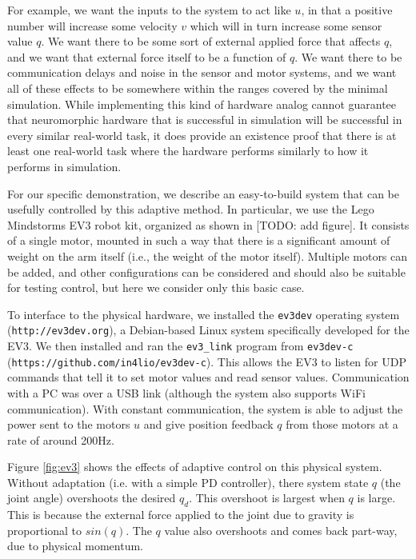 \documentclass{frontiersSCNS} %
\begin{document}
For example, we want the inputs to the system to act like $u$, in that a
positive number will increase some velocity $v$ which will in turn increase some
sensor value $q$.  We want there to be some sort of external applied force that
affects $q$, and we want that external force itself to be a function of $q$.
We want there to be communication delays and noise in the sensor and motor
systems, and we want all of these effects to be somewhere within the
ranges covered by the minimal simulation.  While implementing this kind of
hardware analog cannot guarantee that neuromorphic hardware
that is successful in simulation will be successful in every similar
real-world task, it does provide an existence proof that there is at least
one real-world task where the hardware performs similarly to how it performs in simulation.

For our specific demonstration, we describe an easy-to-build system that can be usefully controlled
by this adaptive method.  In particular, we use the Lego Mindstorms EV3 robot kit,
organized as shown in [TODO: add figure].  It consists of a single
motor, mounted in such a way that there is a significant amount of weight on
the arm itself (i.e., the weight of the motor itself).  Multiple motors can be
added, and other configurations can be considered and should also be suitable
for testing control, but here we consider only this basic case.

To interface to the physical hardware, we installed the \texttt{ev3dev} operating
system (\texttt{http://ev3dev.org}), a Debian-based Linux system specifically developed
for the EV3.  We then installed and ran the \texttt{ev3\_link} program from \texttt{ev3dev-c}
(\texttt{https://github.com/in4lio/ev3dev-c}).  This allows the EV3 to listen for
UDP commands that tell it to set motor values and read sensor values.
Communication with a PC was over a USB link (although the system also
supports WiFi communication).  With constant communication, the system is
able to adjust the power sent to the motors $u$ and give position feedback
$q$ from those motors at a rate of around 200Hz.

Figure \ref{fig:ev3} shows the effects of adaptive control on this physical
system.  Without adaptation (i.e. with a simple PD controller), there system
state $q$ (the joint angle) overshoots the desired $q_d$.  This overshoot
is largest when $q$ is large.  This is because the external force applied to
the joint due to gravity is proportional to $sin(q)$.  The $q$ value also
overshoots and comes back part-way, due to physical momentum.
\end{document}
